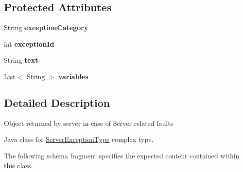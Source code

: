 \subsection*{Protected Attributes}
\begin{DoxyCompactItemize}
\item 
\hypertarget{classcom_1_1telefonica_1_1schemas_1_1unica_1_1rest_1_1common_1_1v1_1_1ServerExceptionType_a57e2a0dd02e3b751d6ff53cc0d5f2d2c}{
String {\bfseries exceptionCategory}}
\label{classcom_1_1telefonica_1_1schemas_1_1unica_1_1rest_1_1common_1_1v1_1_1ServerExceptionType_a57e2a0dd02e3b751d6ff53cc0d5f2d2c}

\item 
\hypertarget{classcom_1_1telefonica_1_1schemas_1_1unica_1_1rest_1_1common_1_1v1_1_1ServerExceptionType_ad4a3b741b253d371ffb457f04cac2e6a}{
int {\bfseries exceptionId}}
\label{classcom_1_1telefonica_1_1schemas_1_1unica_1_1rest_1_1common_1_1v1_1_1ServerExceptionType_ad4a3b741b253d371ffb457f04cac2e6a}

\item 
\hypertarget{classcom_1_1telefonica_1_1schemas_1_1unica_1_1rest_1_1common_1_1v1_1_1ServerExceptionType_a957e709518fc3dfda5d07214282a05df}{
String {\bfseries text}}
\label{classcom_1_1telefonica_1_1schemas_1_1unica_1_1rest_1_1common_1_1v1_1_1ServerExceptionType_a957e709518fc3dfda5d07214282a05df}

\item 
\hypertarget{classcom_1_1telefonica_1_1schemas_1_1unica_1_1rest_1_1common_1_1v1_1_1ServerExceptionType_a9024c671930dc50a5f8d24e3ad517f5c}{
List$<$ String $>$ {\bfseries variables}}
\label{classcom_1_1telefonica_1_1schemas_1_1unica_1_1rest_1_1common_1_1v1_1_1ServerExceptionType_a9024c671930dc50a5f8d24e3ad517f5c}

\end{DoxyCompactItemize}


\subsection{Detailed Description}
Object returned by server in case of Server related faults

Java class for \hyperlink{classcom_1_1telefonica_1_1schemas_1_1unica_1_1rest_1_1common_1_1v1_1_1ServerExceptionType}{ServerExceptionType} complex type.

The following schema fragment specifies the expected content contained within this class.


